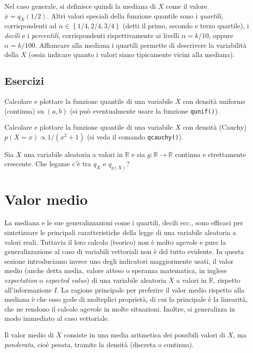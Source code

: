 \documentclass[
  italian,
  letterpaper,
]{book}
\newcommand{\cur}[1]{\left\{ #1 \right\}}
\newcommand{\R}{\mathbb{R}}
\theoremstyle{definition}
\theoremstyle{remark}
\begin{document}
Nel caso generale, si definisce quindi la mediana di \(X\) come il
valore \(\bar{x} = q_X(1/2)\). Altri valori speciali della funzione
quantile sono i \emph{quartili}, corrispondenti ad
\(\alpha \in \cur{ 1/4, 2/4, 3/4}\) (detti il primo, secondo e terzo
quartile), i \emph{decili} e i \emph{percentili}, corrispondenti
rispettivamente ai livelli \(\alpha = k/10\), oppure \(\alpha=k/100\).
Affiancare alla mediana i quartili permette di descrivere la variabilità
della \(X\) (ossia indicare quanto i valori siano tipicamente vicini
alla mediana).

\subsection{Esercizi}\label{esercizi-18}

Calcolare e plottare la funzione quantile di una variabile \(X\) con
densità uniforme (continua) su \((a,b)\) (si può eventualmente usare la
funzione \texttt{qunif()}).

Calcolare e plottare la funzione quantile di una variabile \(X\) con
densità (Cauchy) \(p(X=x) \propto 1/(x^2+1)\) (si veda il comando
\texttt{qcauchy()}).

Sia \(X\) una variabile aleatoria a valori in \(\R\) e sia
\(g: \R \to \R\) continua e strettamente crescente. Che legame c'è tra
\(q_X\) e \(q_{g(X)}\)?

\section{Valor medio}\label{sec-media}

La mediana e le sue generalizzazioni come i quartili, decili ecc., sono
efficaci per sintetizzare le principali caratteristiche della legge di
una variabile aleatoria a valori reali. Tuttavia il loro calcolo
(teorico) non è molto agevole e pure la generalizzazione al caso di
variabili vettoriali non è del tutto evidente. In questa sezione
introduciamo invece uno degli indicatori maggiormente usati, il valor
medio (anche detta media, valore atteso o speranza matematica, in
inglese \emph{expectation} o \emph{expected value}) di una variabile
aleatoria \(X\) a valori in \(\R\), rispetto all'informazione \(I\). La
ragione principale per preferire il valor medio rispetto alla mediana è
che esso gode di molteplici proprietà, di cui la principale è la
linearità, che ne rendono il calcolo agevole in molte situazioni.
Inoltre, si generalizza in modo immediato al caso vettoriale.

Il valor medio di \(X\) consiste in una media aritmetica dei possibili
valori di \(X\), ma \emph{ponderata}, cioè pesata, tramite la densità
(discreta o continua).
\end{document}
